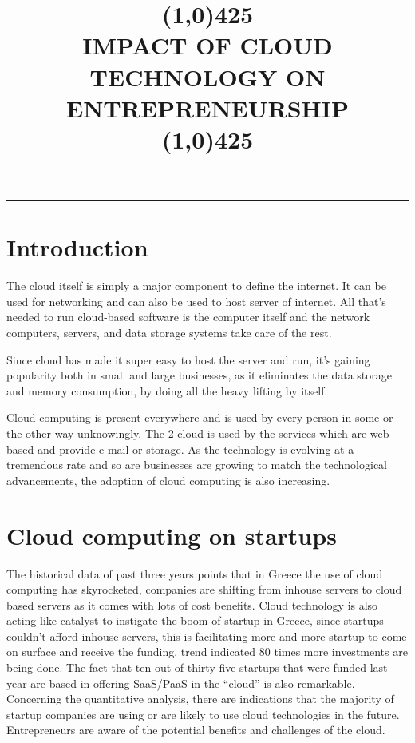 \documentclass[notitlepage]{report}
\date{\parbox{\linewidth}{\centering%
Sarangi Poornasri, 19120077\endgraf
Metallurgical and materials Engg 2021-22 (II) \endgraf
National Institute of Technology, Raipur\endgraf
\begin{flushright}
Guided By:-\endgraf
Dr.Saurabh Gupta\endgraf 
\end{flushright}}}
\begin{document}
\title{\textbf{\line(1,0){425}\\IMPACT OF CLOUD TECHNOLOGY ON ENTREPRENEURSHIP
\\\line(1,0){425}}}

\maketitle
\hrule{}


\section*{Introduction}

The cloud itself is simply a major component to define the internet. It can be used for networking and can also be used to host server of internet. All that’s needed to run cloud-based software is the computer itself and the network computers, servers, and data storage systems take care of the rest.

Since cloud has made it super easy to host the server and run, it’s gaining popularity both in small and large businesses, as it eliminates the data storage and memory consumption, by doing all the heavy lifting by itself.

Cloud computing is present everywhere and is used by every person in some or the other way unknowingly. The 2 cloud is used by the services which are web- based and provide e-mail or storage. As the technology is evolving at a tremendous rate and so are businesses are growing to match the technological advancements, the adoption of cloud computing is also increasing.

\section*{Cloud computing on startups}

The historical data of past three years points that in Greece the use of cloud computing has skyrocketed, companies are shifting from inhouse servers to cloud based servers as it comes with lots of cost benefits. Cloud technology is also acting like catalyst to instigate the boom of startup in Greece, since startups couldn’t afford inhouse servers, this is facilitating more and more startup to come on surface and receive the funding, trend indicated 80 times more investments are being done. The fact that ten out of thirty-five startups that were funded last year are based in offering SaaS/PaaS in the “cloud” is also remarkable. Concerning the quantitative analysis, there are indications that the majority of startup companies are using or are likely to use cloud technologies in the future. Entrepreneurs are aware of the potential benefits and challenges of the cloud. 
\end{document}
